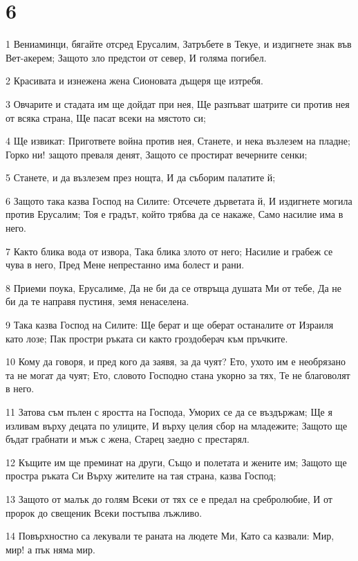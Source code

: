 \chapter{6}

\par 1 Вениаминци, бягайте отсред Ерусалим, Затръбете в Текуе, и издигнете знак във Вет-акерем; Защото зло предстои от север, И голяма погибел.
\par 2 Красивата и изнежена жена Сионовата дъщеря ще изтребя.
\par 3 Овчарите и стадата им ще дойдат при нея, Ще разпъват шатрите си против нея от всяка страна, Ще пасат всеки на мястото си;
\par 4 Ще извикат: Пригответе война против нея, Станете, и нека възлезем на пладне; Горко ни! защото преваля денят, Защото се простират вечерните сенки;
\par 5 Станете, и да възлезем през нощта, И да съборим палатите й;
\par 6 Защото така казва Господ на Силите: Отсечете дърветата й, И издигнете могила против Ерусалим; Тоя е градът, който трябва да се накаже, Само насилие има в него.
\par 7 Както блика вода от извора, Така блика злото от него; Насилие и грабеж се чува в него, Пред Мене непрестанно има болест и рани.
\par 8 Приеми поука, Ерусалиме, Да не би да се отвръща душата Ми от тебе, Да не би да те направя пустиня, земя ненаселена.
\par 9 Така казва Господ на Силите: Ще берат и ще оберат останалите от Израиля като лозе; Пак простри ръката си както гроздоберач към пръчките.
\par 10 Кому да говоря, и пред кого да заявя, за да чуят? Ето, ухото им е необрязано та не могат да чуят; Ето, словото Господно стана укорно за тях, Те не благоволят в него.
\par 11 Затова съм пълен с яростта на Господа, Уморих се да се въздържам; Ще я изливам върху децата по улиците, И върху целия сбор на младежите; Защото ще бъдат грабнати и мъж с жена, Старец заедно с престарял.
\par 12 Къщите им ще преминат на други, Също и полетата и жените им; Защото ще простра ръката Си Върху жителите на тая страна, казва Господ;
\par 13 Защото от малък до голям Всеки от тях се е предал на сребролюбие, И от пророк до свещеник Всеки постъпва лъжливо.
\par 14 Повърхностно са лекували те раната на людете Ми, Като са казвали: Мир, мир! а пък няма мир.
